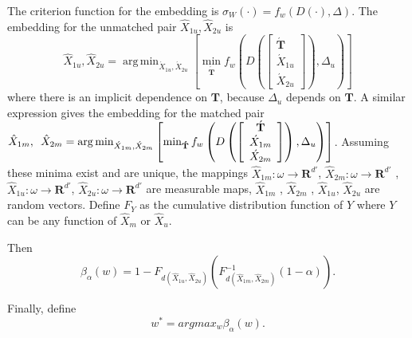 \documentclass[11pt]{article} %
\DeclareMathOperator*{\argmin}{arg\,min}
\begin{document}
 The criterion function for the embedding is $\sigma_W(\cdot) =f_w(D({\cdot}),\Delta)$. The embedding for the unmatched pair ${\hat{X}_{1u},\hat{X}_{2u}}$  is 
 \[
{\hat{X}_{1u},\hat{X}_{2u}}
=\argmin_{\acute{X}_{1u}, \acute{X}_{2u}}\left[\min_{\mathbf{\acute{T}}}
{f_w\left(
D\left(
\left[
\begin{array}{c}
\acute{\mathbf{T}} \\
\acute{X}_{1u} \\
\acute{X}_{2u}
\end {array}
\right]
\right),
\Delta_{u}
\right)
}
\right]
\]
where there is an implicit dependence on $\mathbf{T}$, because $\Delta_{u}$ depends on $\mathbf{T}$. 
A similar expression gives the embedding for the matched pair  
${\hat{X}_{1m},\hspace{0.5em}\hat{X}_{2m}}=\argmin_{\acute{X}_{1m}, \acute{X}_{2m}}\left[\min_{\mathbf{\acute{T}}}
{f_w\left(
D\left(
\left[
\begin{array}{c}
\acute{\mathbf{T}} \\
\acute{X}_{1m} \\
\acute{X}_{2m}
\end {array}
\right]
\right),
\Delta_{u}
\right)
}
\right]$.
 Assuming these minima exist and are unique, the mappings $\hat{X}_{1m}:\omega\rightarrow \mathbf{R}^{d'}$,  $\hat{X}_{2m}:\omega\rightarrow \mathbf{R}^{d'}$ , $\hat{X}_{1u}:\omega\rightarrow \mathbf{R}^{d'}$, 
$\hat{X}_{2u}:\omega\rightarrow \mathbf{R}^{d'}$ are  measurable maps,  $\hat{X}_{1m}$ , $\hat{X}_{2m}$ , $\hat{X}_{1u}$, $\hat{X}_{2u}$ are random vectors. 
Define $F_Y$ as the   cumulative distribution function of  $Y$ where $Y$ can be  any function of $\hat{X}_m$ or $\hat{X}_u$.




 Then $$\beta_{\alpha}\left( w\right)=1-F_{d(\hat{X}_{1u},\hat{X}_{2u})}(F_{d(\hat{X}_{1m},\hat{X}_{2m})}^{-1}(1-\alpha)).$$

 Finally, define $$w^{*}=argmax_w{\beta_{\alpha}\left( w\right)}. $$
\end{document}
